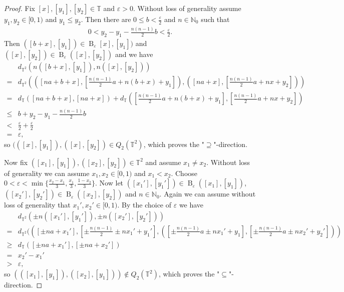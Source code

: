 \begin{proof}
	Fix $[x], [y_1], [y_2] \in \mathbb{T}$ and $\varepsilon > 0$. Without loss of generality assume $y_1, y_2 \in [0, 1)$ and $y_1 \leq y_2$. Then there are $0 \leq b < \frac{\varepsilon}{2}$ and $n \in \mathbb{N}_0$ such that
	\begin{align*}
		0 < y_2 - y_1 - \frac{n(n-1)}{2}b < \frac{\varepsilon}{2}.
	\end{align*}
	Then $([b+x], [y_1]) \in \operatorname{B}_\varepsilon[x], [y_1])$ and $([x],[y_2]) \in \operatorname{B}_\varepsilon([x], [y_2])$ and we have
	\begin{align*}
		&d_{\mathbb{T}^2}(n([b+x], [y_1]), n([x], [y_2]))\\
		= &d_{\mathbb{T}^2}(([na+b+x], [\frac{n(n-1)}{2}a + n(b+x) + y_1]), ([na+x], [\frac{n(n-1)}{2}a + nx + y_2]))\\
		= &d_\mathbb{T}([na+b+x], [na+x]) + d_\mathbb{T}([\frac{n(n-1)}{2}a + n(b+x) + y_1], [\frac{n(n-1)}{2}a + nx + y_2])\\
		\leq &b + y_2 - y_1 - \frac{n(n-1)}{2}b\\
		< &\frac{\varepsilon}{2} + \frac{\varepsilon}{2}\\
		= &\varepsilon,
	\end{align*}
	so $(([x], [y_1]), ([x], [y_2]) \in Q_2(\mathbb{T}^2)$, which proves the "$\supseteq$"-direction.
	
	Now fix $([x_1], [y_1]), ([x_2], [y_2]) \in \mathbb{T}^2$ and assume $x_1 \neq x_2$. Without loss of generality we can assume $x_1, x_2 \in [0, 1)$ and $x_1 < x_2$. Choose $0 < \varepsilon < \min\{\frac{x_2-x_1}{3}, \frac{x_1}{3}, \frac{1 - x_2}{3}\}$. Now let $([x_1'], [y_1']) \in \operatorname{B}_\varepsilon([x_1], [y_1])$, $([x_2'], [y_2']) \in \operatorname{B}_\varepsilon([x_2], [y_2])$ and $n \in \mathbb{N}_0$. Again we can assume without loss of generality that $x_1', x_2' \in [0, 1)$. By the choice of $\varepsilon$ we have
	\begin{align*}
		&d_{\mathbb{T}^2}(\pm n([x_1'], [y_1']), \pm n([x_2'], [y_2']))\\
		= &d_{\mathbb{T}^2}(([\pm na + x_1'], [\pm \frac{n(n-1)}{2} \pm nx_1' + y_1'], ([\pm \frac{n(n-1)}{2}a \pm nx_1' + y_1], [\pm \frac{n(n-1)}{2}a \pm nx_2' + y_2']))\\
		\geq &d_\mathbb{T}([\pm na + x_1'], [\pm na + x_2'])\\
		= &x_2' - x_1'\\
		> &\varepsilon,
	\end{align*}
	so $(([x_1], [y_1]), ([x_2], [y_1])) \notin Q_2(\mathbb{T}^2)$, which proves the "$\subseteq$"-direction.
\end{proof}
